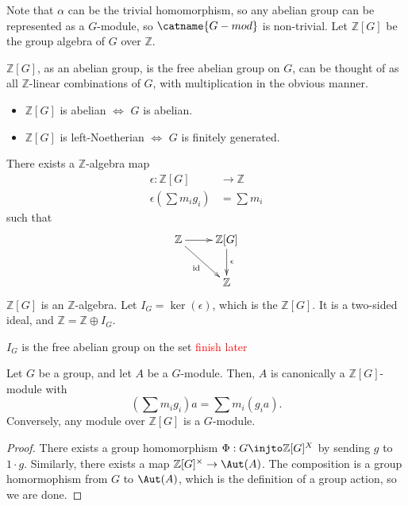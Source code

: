 \documentclass[12pt]{scrartcl}
\begin{document}
Note that $\alpha$ can be the trivial homomorphism, so any abelian group can be represented as a $G$-module, so $\catname{G-mod}$ is non-trivial.
Let $\mathbb{Z}[G]$ be the group algebra of $G$ over $\mathbb{Z}$.
\begin{definition}
	$\mathbb{Z}[G]$, as an abelian group, is the free abelian group on $G$, can be thought of as all $\mathbb{Z}$-linear combinations of $G$, with multiplication in the obvious manner.
\end{definition}
	\begin{itemize}
		\item $\mathbb{Z}[G]$ is abelian $\iff$ $G$ is abelian.
		\item $\mathbb{Z}[G]$ is left-Noetherian $\iff$ $G$ is finitely generated.
	\end{itemize}
	There exists a $\mathbb{Z}$-algebra map
	\begin{align*}
		\epsilon: \mathbb{Z}[G] &\to \mathbb{Z} \\
		\epsilon \left(\sum m_i g_i\right) &= \sum m_i
	\end{align*}
	such that
	\[
		\begin{array}{c}
			\xymatrix{
				\mathbb{Z} \ar[r]\ar[dr]_{\textrm{id}} & \mathbb{Z}[G] \ar[d]^{\epsilon} \\
							 & \mathbb{Z} \\
						 }	
	\end{array}
	\]
$\mathbb{Z}[G]$ is an  $\mathbb{Z}$-algebra.
Let $I_G = \ker(\epsilon)$, which is the  $\mathbb{Z}[G]$.
It is a two-sided ideal, and $\mathbb{Z} = \mathbb{Z} \oplus I_G$.

\begin{lemma}
	$I_G$ is the free abelian group on the set \textcolor{red}{finish later}
\end{lemma}

Let $G$ be a group, and let $A$ be a $G$-module.
Then, $A$ is canonically a $\mathbb{Z}[G]$-module with
\[
	\left(\sum m_i g_i\right) a = \sum m_i  \left(g_i a\right).
\]
Conversely, any module over $\mathbb{Z}[G]$ is a $G$-module.

\begin{proof}
There exists a group homomorphism $\Phi: G \injto \mathbb{Z}[G]^X$ by sending $g$ to $1 \cdot g$.
Similarly, there exists a map $\mathbb{Z}[G]^{\times }\to \Aut(A)$.
The composition is a group homormophism from $G$ to $\Aut(A)$, which is the definition of a group action, so we are done.
\end{proof}
\end{document}
